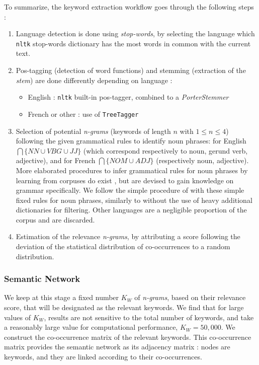 To summarize, the keyword extraction workflow goes through the following steps :

\begin{enumerate}
\item Language detection is done using \textit{stop-words}, by selecting the language which \texttt{nltk} stop-words dictionary has the most words in common with the current text.
\item Pos-tagging (detection of word functions) and stemming (extraction of the \emph{stem}) are done differently depending on language :
\begin{itemize}
\item English : \texttt{nltk} built-in pos-tagger, combined to a \emph{PorterStemmer}
\item French or other : use of \texttt{TreeTagger}~\citep{schmid1994probabilistic}
\end{itemize}
\item Selection of potential \textit{n-grams} (keywords of length $n$ with $1 \leq n \leq 4$) following the given grammatical rules to identify noun phrases: for English $\bigcap \{NN \cup VBG \cup JJ \}$ (which correspond respectively to noun, gerund verb, adjective), and for French $\bigcap \{NOM \cup ADJ\}$ (respectively noun, adjective). More elaborated procedures to infer grammatical rules for noun phrases by learning from corpuses do exist \citep{cardie1998error}, but are devised to gain knowledge on grammar specifically. We follow the simple procedure of \cite{chavalarias2013phylomemetic} with these simple fixed rules for noun phrases, similarly to \cite{kumar2008automatic} without the use of heavy additional dictionaries for filtering. Other languages are a negligible proportion of the corpus and are discarded.
\item Estimation of the relevance \textit{n-grams}, by attributing a score following the deviation of the statistical distribution of co-occurrences to a random distribution.
\end{enumerate}



\subsubsection*{Semantic Network}

We keep at this stage a fixed number $K_W$ of \textit{n-grams}, based on their relevance score, that will be designated as the relevant keywords. We find that for large values of $K_W$, results are not sensitive to the total number of keywords, and take a reasonably large value for computational performance, $K_W = 50,000$. We construct the co-occurrence matrix of the relevant keywords. This co-occurrence matrix provides the semantic network as its adjacency matrix : nodes are keywords, and they are linked according to their co-occurrences.



